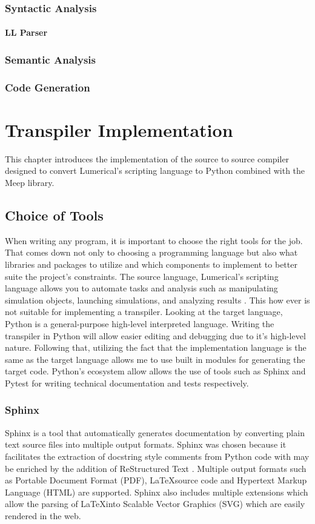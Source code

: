 \subsection*{Syntactic Analysis}

\subsubsection*{LL Parser}

\subsection*{Semantic Analysis}

\subsection*{Code Generation}


\chapter{Transpiler Implementation}
This chapter introduces the implementation of the source to source compiler designed to convert Lumerical's scripting language to Python combined with the Meep library. 
\section{Choice of Tools }
When writing any program, it is important to choose the right tools for the job. That comes down not only to choosing a programming language but also what libraries and packages to utilize and which components to implement to better suite the project's constraints. The source language, Lumerical's scripting language allows you to automate tasks and analysis such as manipulating simulation objects, launching simulations, and analyzing results \cite{ansys_lsf}. This how ever is not suitable for implementing a transpiler. Looking at the target language, Python is a general-purpose high-level interpreted language. Writing the transpiler in Python will allow easier editing and debugging due to it's high-level nature. Following that, utilizing the fact that the implementation language is the same as the target language allows me to use built in modules for generating the target code. Python's ecosystem allow allows the use of tools such as Sphinx and Pytest for writing technical documentation and tests respectively.

\subsection{Sphinx}
Sphinx is a tool that automatically generates documentation by converting plain text source files into multiple output formats\cite{sphinx_quickstart}. Sphinx was chosen because it facilitates the extraction of docstring style comments from Python code with may be enriched by the addition of ReStructured Text \cite{docutils_rst}. Multiple output formats such as Portable Document Format (PDF), \LaTeX source code and Hypertext Markup Language (HTML) are supported. Sphinx also includes multiple extensions which allow the parsing of \LaTeX into Scalable Vector Graphics (SVG) which are easily rendered in the web.

